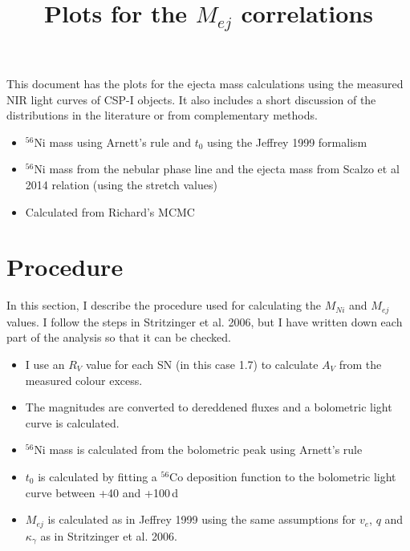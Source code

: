 \documentclass{article}
\newcommand{\Nif}{\rm $^{56}$Ni }
\begin{document}
\title{Plots for the $M_{ej}$ correlations}
\maketitle

This document has the plots for the ejecta mass calculations using the measured NIR light curves of CSP-I objects. It also includes a short discussion of the distributions in the literature or from complementary methods.

\begin{itemize}

\item \Nif mass using Arnett's rule and $t_0$ using the Jeffrey 1999 formalism

\item \Nif mass from the nebular phase line and the ejecta mass from Scalzo et al 2014 relation (using the stretch values)

\item Calculated from Richard's MCMC 

\end{itemize}


\section*{Procedure}
In this section,  I describe the procedure used for calculating the $M_{Ni}$ and $M_{ej}$ values. I follow the steps in Stritzinger et al. 2006, but I have written down each part of the analysis so that it can be checked.

\begin{itemize}
\item I use an $R_V$ value for each SN (in this case 1.7) to calculate $A_V$ from the measured colour excess. 
\item The magnitudes are converted to dereddened fluxes and a bolometric light curve is calculated.  

\item $^{56}$Ni mass is calculated from the bolometric peak using Arnett's rule

\item $t_0$ is calculated by fitting a ${^56}$Co deposition function to the bolometric light curve between +40 and +100\,d

\item $M_{ej}$ is calculated as in Jeffrey 1999 using the same assumptions for $v_e$, $q$ and $\kappa_{\gamma}$ as in Stritzinger et al. 2006.
\end{itemize}
\end{document}
